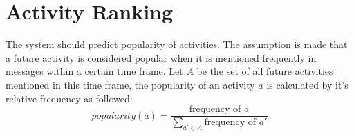 
\section{Activity Ranking}
The system should predict popularity of activities. The assumption is made that a future activity is considered popular when it is mentioned frequently in messages within a certain time frame. Let $A$ be the set of all future activities mentioned in this time frame, the popularity of an activity $a$ is calculated by it's relative frequency as followed:
\begin{equation}
popularity(a) = \frac{\text{frequency of }a}{\displaystyle\sum\limits_{a'\in A} \text{frequency of }a'}
\end{equation}